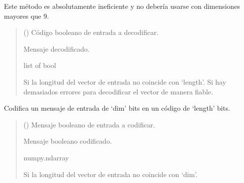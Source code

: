 \documentclass[letterpaper,10pt,english]{sphinxmanual}
\begin{document}
\begin{fulllineitems}
\begin{fulllineitems}
\sphinxAtStartPar
Este método es absolutamente ineficiente y no debería usarse con dimensiones
mayores que 9.
\begin{quote}\begin{description}
\sphinxAtStartPar
{} () \textendash{} Código booleano de entrada a decodificar.

\sphinxAtStartPar
Mensaje decodificado.

\sphinxAtStartPar
list of bool

\sphinxAtStartPar
{} \textendash{} Si la longitud del vector de entrada no coincide con ‘length’.
    Si hay demasiados errores para decodificar el vector de manera fiable.

\end{description}\end{quote}

\end{fulllineitems}


\begin{fulllineitems}
\label{\detokenize{utils.bool:utils.bool.LinearSystECC.encode}}
\pysigstartsignatures
{}
\pysigstopsignatures
\sphinxAtStartPar
Codifica un mensaje de entrada de ‘dim’ bits en un código de ‘length’ bits.
\begin{quote}\begin{description}
\sphinxAtStartPar
{} () \textendash{} Mensaje booleano de entrada a codificar.

\sphinxAtStartPar
Mensaje booleano codificado.

\sphinxAtStartPar
numpy.ndarray

\sphinxAtStartPar
{} \textendash{} Si la longitud del vector de entrada no coincide con ‘dim’.

\end{description}\end{quote}

\end{fulllineitems}


\end{fulllineitems}
\end{document}
